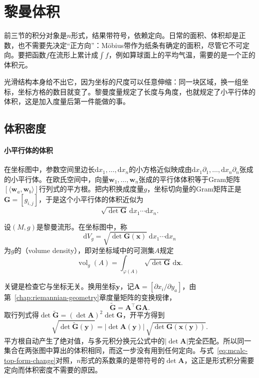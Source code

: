 \section{黎曼体积}
\label{sec:mcalc-volume}

前三节的积分对象是$n$形式，结果带符号，依赖定向。日常的面积、体积却是正数，也不需要先决定“正方向”：M\"obius带作为纸条有确定的面积，尽管它不可定向。要把函数$f$在流形上累计成$\int f$，例如算球面上的平均气温，需要的是一个正的体积元。

光滑结构本身给不出它，因为坐标的尺度可以任意伸缩：同一块区域，换一组坐标，坐标方格的数目就变了。黎曼度量规定了长度与角度，也就规定了小平行体的体积，这是加入度量后第一件能做的事。

\subsection{体积密度}
\label{sec:mcalc-volume-density}

\paragraph{小平行体的体积}
在坐标图中，参数空间里边长$\mathrm dx_1,\ldots,\mathrm dx_n$的小方格近似映成由$\mathrm dx_1\partial_1,\ldots,\mathrm dx_n\partial_n$张成的小平行体。在欧氏空间中，向量$\bm w_1,\ldots,\bm w_n$张成的平行体体积等于Gram矩阵$[\langle\bm w_a,\bm w_b\rangle]$行列式的平方根。把内积换成度量$g$，坐标切向量的Gram矩阵正是$\bm G=[g_{i,j}]$，于是这个小平行体的体积近似为
\[
\sqrt{\det\bm G}\,\mathrm dx_1\cdots\mathrm dx_n .
\]

\begin{definition}[黎曼体积密度]
\label{def:mcalc-volume-density}
设$(M,g)$是黎曼流形。在坐标图中，称
\begin{equation}
\mathrm dV_g=\sqrt{\det\bm G(\bm x)}\;\mathrm dx_1\cdots\mathrm dx_n
\label{eq:mcalc-volume-density}
\end{equation}
为$g$的（volume density），即对坐标域中的可测集$A$规定
\begin{equation}
\operatorname{vol}_g(A)=\int_{\varphi(A)}\sqrt{\det\bm G}\,\mathrm d\bm x .
\label{eq:mcalc-chart-volume}
\end{equation}
\end{definition}

关键是检查它与坐标无关。换用坐标$\bm y$，记$\bm A=[\partial x_i/\partial y_a]$，由第~\ref{chap:riemannian-geometry}章度量矩阵的变换规律，
\[
\widetilde{\bm G}=\bm A^{\top}\bm G\bm A .
\]
取行列式得$\det\widetilde{\bm G}=(\det\bm A)^2\det\bm G$，开平方得到
\begin{equation}
\sqrt{\det\widetilde{\bm G}(\bm y)}=\lvert\det\bm A(\bm y)\rvert\,\sqrt{\det\bm G(\bm x(\bm y))}.
\label{eq:mcalc-density-change}
\end{equation}
平方根自动产生了绝对值，与多元积分换元公式中的$\lvert\det\bm A\rvert$完全匹配。所以同一集合在两张图中算出的体积相同，而这一步没有用到任何定向。与式~\eqref{eq:mcalc-top-form-change}对照，$n$形式的系数乘的是带符号的$\det\bm A$，这正是形式积分需要定向而体积密度不需要的原因。


